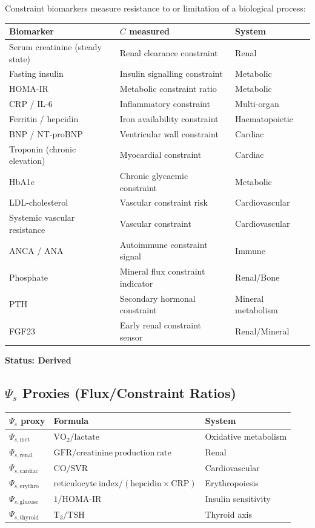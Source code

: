 \documentclass[12pt,a4paper]{article}
\begin{document}
Constraint biomarkers measure resistance to or limitation of a biological process:

\begin{center}
\begin{tabular}{lll}
\toprule
Biomarker & $C$ measured & System \\
\midrule
Serum creatinine (steady state) & Renal clearance constraint & Renal \\
Fasting insulin & Insulin signalling constraint & Metabolic \\
HOMA-IR & Metabolic constraint ratio & Metabolic \\
CRP / IL-6 & Inflammatory constraint & Multi-organ \\
Ferritin / hepcidin & Iron availability constraint & Haematopoietic \\
BNP / NT-proBNP & Ventricular wall constraint & Cardiac \\
Troponin (chronic elevation) & Myocardial constraint & Cardiac \\
HbA1c & Chronic glycaemic constraint & Metabolic \\
LDL-cholesterol & Vascular constraint risk & Cardiovascular \\
Systemic vascular resistance & Vascular constraint & Cardiovascular \\
ANCA / ANA & Autoimmune constraint signal & Immune \\
Phosphate & Mineral flux constraint indicator & Renal/Bone \\
PTH & Secondary hormonal constraint & Mineral metabolism \\
FGF23 & Early renal constraint sensor & Renal/Mineral \\
\bottomrule
\end{tabular}
\end{center}

\textbf{Status: Derived}

\subsection{$\Psi_s$ Proxies (Flux/Constraint Ratios)}

\begin{center}
\begin{tabular}{lll}
\toprule
$\Psi_s$ proxy & Formula & System \\
\midrule
$\Psi_{s,\mathrm{met}}$ & $\mathrm{VO}_2 / \mathrm{lactate}$ & Oxidative metabolism \\
$\Psi_{s,\mathrm{renal}}$ & $\mathrm{GFR} / \mathrm{creatinine\ production\ rate}$ & Renal \\
$\Psi_{s,\mathrm{cardiac}}$ & $\mathrm{CO} / \mathrm{SVR}$ & Cardiovascular \\
$\Psi_{s,\mathrm{erythro}}$ & $\mathrm{reticulocyte\ index} / \mathrm{(hepcidin \times CRP)}$ & Erythropoiesis \\
$\Psi_{s,\mathrm{glucose}}$ & $1 / \mathrm{HOMA\text{-}IR}$ & Insulin sensitivity \\
$\Psi_{s,\mathrm{thyroid}}$ & $\mathrm{T}_3 / \mathrm{TSH}$ & Thyroid axis \\
\bottomrule
\end{tabular}
\end{center}
\end{document}
